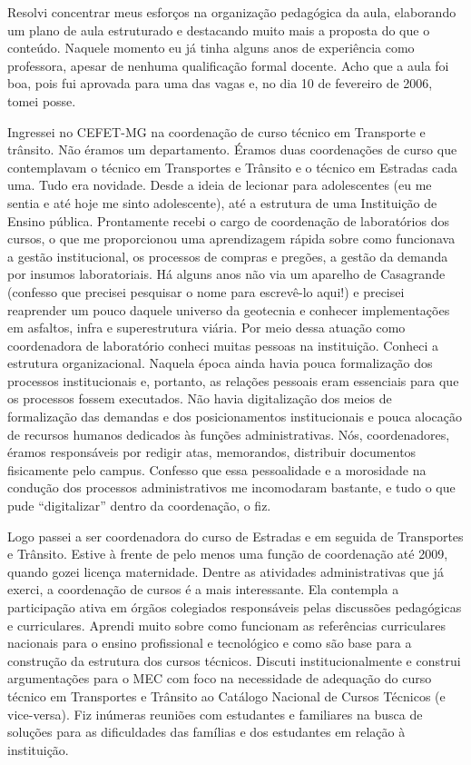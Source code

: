 \documentclass[
]{book}
\begin{document}
Resolvi concentrar meus esforços na organização pedagógica da aula,
elaborando um plano de aula estruturado e destacando muito mais a
proposta do que o conteúdo. Naquele momento eu já tinha alguns anos de
experiência como professora, apesar de nenhuma qualificação formal
docente. Acho que a aula foi boa, pois fui aprovada para uma das vagas
e, no dia 10 de fevereiro de 2006, tomei posse.

Ingressei no CEFET-MG na coordenação de curso técnico em Transporte e
trânsito. Não éramos um departamento. Éramos duas coordenações de curso
que contemplavam o técnico em Transportes e Trânsito e o técnico em
Estradas cada uma. Tudo era novidade. Desde a ideia de lecionar para
adolescentes (eu me sentia e até hoje me sinto adolescente), até a
estrutura de uma Instituição de Ensino pública. Prontamente recebi o
cargo de coordenação de laboratórios dos cursos, o que me proporcionou
uma aprendizagem rápida sobre como funcionava a gestão institucional, os
processos de compras e pregões, a gestão da demanda por insumos
laboratoriais. Há alguns anos não via um aparelho de Casagrande
(confesso que precisei pesquisar o nome para escrevê-lo aqui!) e
precisei reaprender um pouco daquele universo da geotecnia e conhecer
implementações em asfaltos, infra e superestrutura viária. Por meio
dessa atuação como coordenadora de laboratório conheci muitas pessoas na
instituição. Conheci a estrutura organizacional. Naquela época ainda
havia pouca formalização dos processos institucionais e, portanto, as
relações pessoais eram essenciais para que os processos fossem
executados. Não havia digitalização dos meios de formalização das
demandas e dos posicionamentos institucionais e pouca alocação de
recursos humanos dedicados às funções administrativas. Nós,
coordenadores, éramos responsáveis por redigir atas, memorandos,
distribuir documentos fisicamente pelo campus. Confesso que essa
pessoalidade e a morosidade na condução dos processos administrativos me
incomodaram bastante, e tudo o que pude ``digitalizar'' dentro da
coordenação, o fiz.

Logo passei a ser coordenadora do curso de Estradas e em seguida de
Transportes e Trânsito. Estive à frente de pelo menos uma função de
coordenação até 2009, quando gozei licença maternidade. Dentre as
atividades administrativas que já exerci, a coordenação de cursos é a
mais interessante. Ela contempla a participação ativa em órgãos
colegiados responsáveis pelas discussões pedagógicas e curriculares.
Aprendi muito sobre como funcionam as referências curriculares nacionais
para o ensino profissional e tecnológico e como são base para a
construção da estrutura dos cursos técnicos. Discuti institucionalmente
e construi argumentações para o MEC com foco na necessidade de adequação
do curso técnico em Transportes e Trânsito ao Catálogo Nacional de
Cursos Técnicos (e vice-versa). Fiz inúmeras reuniões com estudantes e
familiares na busca de soluções para as dificuldades das famílias e dos
estudantes em relação à instituição.
\end{document}
